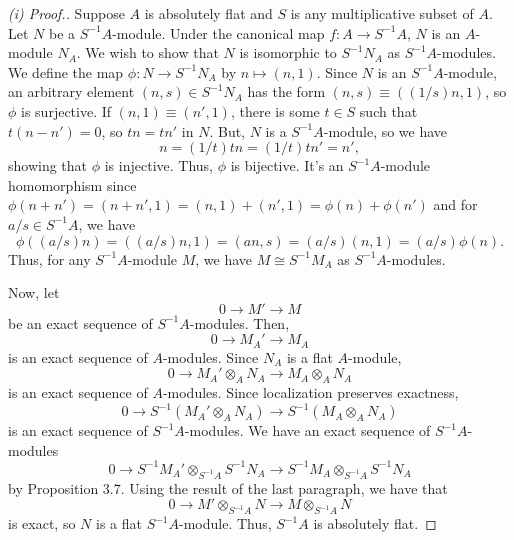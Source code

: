 \begin{proof}[(i) Proof.]
Suppose $A$ is absolutely flat and $S$ is any multiplicative subset of $A$. Let $N$ be a $S^{-1}A$-module. Under the canonical map $f : A \to S^{-1}A$, $N$ is an $A$-module $N_A$. We wish to show that
$N$ is isomorphic to $S^{-1}N_A$ as $S^{-1}A$-modules. We define the map $\phi : N \to S^{-1}N_A$ by $n \mapsto (n, 1)$. Since $N$ is an $S^{-1}A$-module, an arbitrary element $(n,s) \in S^{-1}N_A$ has the
form $(n,s) \equiv ((1/s)n, 1)$, so $\phi$ is surjective. If $(n,1) \equiv (n',1)$, there is some $t \in S$ such that $t(n - n') = 0$, so $tn = tn'$ in $N$. But, $N$ is
a $S^{-1}A$-module, so we have
$$n = (1/t)tn = (1/t)tn' = n',$$
showing that $\phi$ is injective. Thus, $\phi$ is bijective. It's an $S^{-1}A$-module homomorphism since $\phi(n + n') = (n + n', 1) = (n, 1) + (n', 1) = \phi(n) + \phi(n')$ and for $a/s \in S^{-1}A$, we have
$$\phi((a/s)n) = ((a/s)n, 1) = (an, s) = (a/s)(n,1) = (a/s)\phi(n).$$
Thus, for any $S^{-1}A$-module $M$, we have $M \cong S^{-1}M_A$ as $S^{-1}A$-modules.

Now, let 
$$0 \to M' \to M$$
be an exact sequence of $S^{-1}A$-modules. Then,
$$0 \to M_A' \to M_A$$
is an exact sequence of $A$-modules. Since $N_A$ is a flat $A$-module,
$$0 \to M_A' \otimes_A N_A \to M_A \otimes_A N_A$$
is an exact sequence of $A$-modules. Since localization preserves exactness,
$$0 \to S^{-1}(M_A' \otimes_A N_A) \to S^{-1}(M_A \otimes_A N_A)$$
is an exact sequence of $S^{-1}A$-modules. We have an exact sequence of $S^{-1}A$-modules
$$0 \to S^{-1}M_A' \otimes_{S^{-1}A} S^{-1} N_A \to S^{-1}M_A \otimes_{S^{-1}A} S^{-1} N_A$$
by Proposition 3.7. Using the result of the last paragraph, we have that
$$0 \to M' \otimes_{S^{-1}A} N \to M \otimes_{S^{-1}A} N$$
is exact, so $N$ is a flat $S^{-1}A$-module. Thus, $S^{-1}A$ is absolutely flat.
\end{proof}

